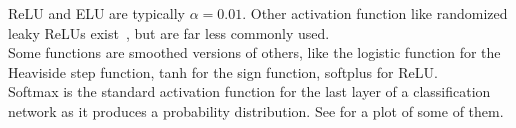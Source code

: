 \begin{table}[H]
{             ReLU and ELU are typically $\alpha = 0.01$. Other activation
             function like randomized leaky ReLUs exist~\cite{xu2015empirical},
             but are far less commonly used.\\
             Some functions are smoothed versions of others, like the logistic
             function for the Heaviside step function, tanh for the sign
             function, softplus for ReLU.\\
             Softmax is the standard activation function for the last layer of
             a classification network as it produces a probability
             distribution. See  for a plot
             of some of them.}
    \label{table:activation-functions-overview}
\end{table}

